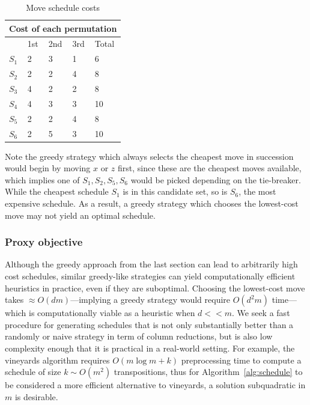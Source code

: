 \documentclass[sn-mathphys]{sn-jnl}
\begin{document}
\begin{table}[h]
\caption{Move schedule costs}
\centering
\begin{tabular}{ m{0.4cm} m{0.8cm} m{0.8cm} m{0.8cm} m{0.8cm}  }
 \hline
 \multicolumn{5}{c}{Cost of each permutation} \\
 \hline
 & 1st & 2nd & 3rd & Total\\
 \hline
 $S_1$ & 2 & 3 & 1 & 6 \\
 \hline 
 $S_2$ & 2 & 2 & 4 & 8 \\
  \hline 
 $S_3$ & 4 & 2 & 2 & 8 \\
  \hline 
 $S_4$ & 4 & 3 & 3 & 10 \\
  \hline 
 $S_5$ & 2 & 2 & 4 & 8  \\
  \hline 
 $S_6$ & 2 & 5 & 3 & 10\\
 \hline
\end{tabular}
\label{table:move_costs}
\end{table}
Note the greedy strategy which always selects the cheapest move in succession would begin by moving $x$ or $z$ first, since these are the cheapest moves available, which implies one of $S_1, S_2, S_5, S_6$ would be picked depending on the tie-breaker. While the cheapest schedule $S_1$ is in this candidate set, so is $S_6$, the most expensive schedule. As a result, a greedy strategy which chooses the lowest-cost move may not yield an optimal schedule. 

\subsubsection{Proxy objective}\label{sec:proxy_objective}
Although the greedy approach from the last section can lead to arbitrarily high cost schedules, similar greedy-like strategies can yield computationally efficient heuristics in practice, even if they are suboptimal. 
Choosing the lowest-cost move takes $\approx O(dm)$---implying a greedy strategy would require $O(d^2 m)$ time---which is computationally viable as a heuristic when $d << m$. 
We seek a fast procedure for generating schedules that is not only substantially better than a randomly or naive strategy in term of column reductions, but is also low complexity enough that it is practical in a real-world setting.
For example, the vineyards algorithm requires $O(m \log m + k)$ preprocessing time to compute a schedule of size $k \sim O(m^2)$ transpositions, thus for Algorithm~\ref{alg:schedule} to be considered a more efficient alternative to vineyards, a solution subquadratic in $m$ is desirable. 
\end{document}
